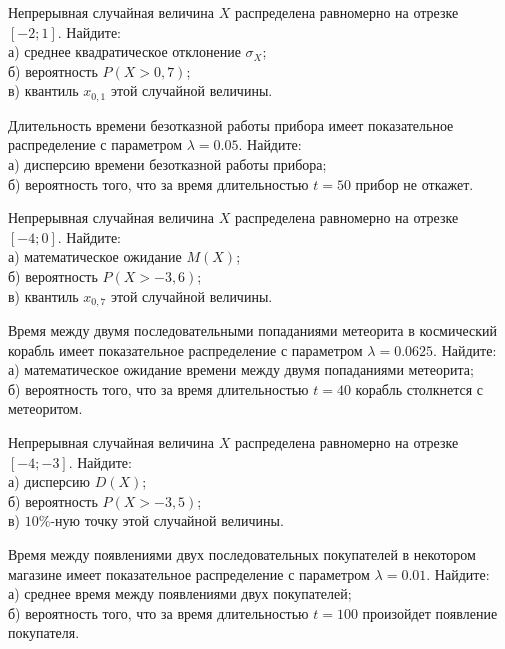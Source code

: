 

\z Непрерывная случайная величина $X$ распределена равномерно на отрезке $[-2; 1]$. Найдите: \\ \quad а) среднее квадратическое отклонение $\sigma_X$; \\ \quad б) вероятность $P(X>0{,}7)$; \\ \quad в) квантиль $x_{0{,}1}$ этой случайной величины.


\vfill

\z Длительность времени безотказной работы прибора имеет показательное распределение с параметром $\lambda = 0.05$. Найдите: \\ \quad а) дисперсию времени безотказной работы прибора; \\ \quad б) вероятность того, что за время длительностью $t = 50$ прибор не откажет.
 

\vfill

\newpage\setcounter{zad}{0}

\z Непрерывная случайная величина $X$ распределена равномерно на отрезке $[-4; 0]$. Найдите: \\ \quad а) математическое ожидание $M(X)$; \\ \quad б) вероятность $P(X>-3{,}6)$; \\ \quad в) квантиль $x_{0{,}7}$ этой случайной величины.


\vfill

\z Время между двумя последовательными попаданиями метеорита в космический корабль имеет показательное распределение с параметром $\lambda = 0.0625$. Найдите: \\ \quad а) математическое ожидание времени между двумя попаданиями метеорита; \\ \quad б) вероятность того, что за время длительностью $t = 40$ корабль  столкнется с метеоритом.
 

\vfill

\newpage\setcounter{zad}{0}

\z Непрерывная случайная величина $X$ распределена равномерно на отрезке $[-4; -3]$. Найдите: \\ \quad а) дисперсию $D(X)$; \\ \quad б) вероятность $P(X>-3{,}5)$; \\ \quad в) $10\%$-ную точку этой случайной величины.


\vfill

\z Время между появлениями двух последовательных покупателей в некотором магазине имеет показательное распределение с параметром $\lambda = 0.01$. Найдите: \\ \quad а) среднее время между появлениями двух покупателей; \\ \quad б) вероятность того, что за время длительностью $t = 100$  произойдет появление покупателя.
 

